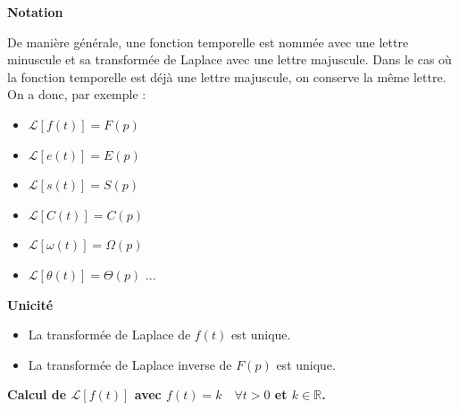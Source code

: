 \documentclass[10pt,fleqn]{article} %
\begin{document}
\begin{rem}
\textbf{Notation}

De manière générale, une fonction temporelle est nommée avec une lettre minuscule et sa transformée de Laplace avec une lettre majuscule. Dans le cas où la fonction temporelle est déjà une lettre majuscule, on conserve la même lettre. On a donc, par exemple : 
\begin{multicols}{2}
\begin{itemize}
\item $\mathcal{L}\left[f(t)\right] = F(p)$
\item $\mathcal{L}\left[e(t)\right] = E(p)$
\item $\mathcal{L}\left[s(t)\right] = S(p)$
\item $\mathcal{L}\left[C(t)\right] = C(p)$
\item $\mathcal{L}\left[\omega(t)\right] = \Omega(p)$
\item $\mathcal{L}\left[\theta(t)\right] = \Theta(p)$ ...
\end{itemize}
\end{multicols}
\end{rem}

\textbf{Unicité}

\begin{itemize}
\item La transformée de Laplace de $f(t)$ est unique.
\item La transformée de Laplace inverse de $F(p)$ est unique.
\end{itemize}



\begin{exemple}
\textbf{Calcul de $\mathcal{L}\left[f(t) \right]$ avec $f(t)=k\quad \forall t> 0$ et $k\in \mathbb{R}$.}




\end{exemple}
\end{document}
